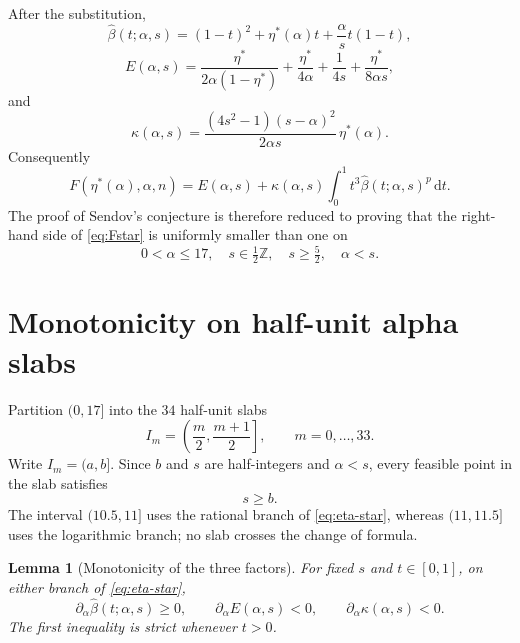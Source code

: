 \documentclass[11pt]{amsart}
\newtheorem{lemma}[theorem]{Lemma}
\theoremstyle{definition}
\newcommand{\dd}{\,\mathrm d}
\newcommand{\etaStar}{\eta^{\ast}}
\newcommand{\betaHat}{\widehat\beta}
\begin{document}
After the substitution,
\begin{equation}\label{eq:beta-hat}
 \betaHat(t;\alpha,s)
 =(1-t)^2+\etaStar(\alpha)t
 +\frac{\alpha}{s}t(1-t),
\end{equation}
\begin{equation}\label{eq:E}
 E(\alpha,s)=
 \frac{\etaStar}{2\alpha(1-\etaStar)}
 +\frac{\etaStar}{4\alpha}
 +\frac1{4s}
 +\frac{\etaStar}{8\alpha s},
\end{equation}
and
\begin{equation}\label{eq:kappa}
 \kappa(\alpha,s)=
 \frac{(4s^2-1)(s-\alpha)^2}{2\alpha s}\,\etaStar(\alpha).
\end{equation}
Consequently
\begin{equation}\label{eq:Fstar}
 F(\etaStar(\alpha),\alpha,n)
 =E(\alpha,s)+\kappa(\alpha,s)
 \int_0^1 t^3\betaHat(t;\alpha,s)^p\dd t.
\end{equation}
The proof of Sendov's conjecture is therefore reduced to proving that the right-hand side of \eqref{eq:Fstar} is uniformly smaller than one on
\[
 0<\alpha\le17,
 \quad
 s\in\tfrac12\mathbb Z,
 \quad
 s\ge\tfrac52,
 \quad
 \alpha<s.
\]

\section{Monotonicity on half-unit alpha slabs}\label{sec:slabs}

Partition $(0,17]$ into the $34$ half-unit slabs
\begin{equation}\label{eq:slabs}
 I_m=\left(\frac m2,\frac{m+1}{2}\right],
 \qquad m=0,\ldots,33.
\end{equation}
Write $I_m=(a,b]$.  Since $b$ and $s$ are half-integers and $\alpha<s$, every feasible point in the slab satisfies
\begin{equation}\label{eq:s-ge-b}
 s\ge b.
\end{equation}
The interval $(10.5,11]$ uses the rational branch of \eqref{eq:eta-star}, whereas $(11,11.5]$ uses the logarithmic branch; no slab crosses the change of formula.

\begin{lemma}[Monotonicity of the three factors]\label{lem:slab-monotone}
For fixed $s$ and $t\in[0,1]$, on either branch of \eqref{eq:eta-star},
\[
 \partial_\alpha\betaHat(t;\alpha,s)\ge0,
 \qquad
 \partial_\alpha E(\alpha,s)<0,
 \qquad
 \partial_\alpha\kappa(\alpha,s)<0.
\]
The first inequality is strict whenever $t>0$.
\end{lemma}
\end{document}
